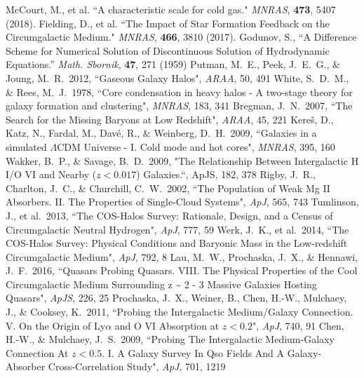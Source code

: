 \documentclass[11pt,letterpaper,english]{article}
\begin{document}
{\footnotesize

\renewcommand{\section}[2]{}
\begin{thebibliography}{500}
 McCourt, M., et al. ``A characteristic scale for cold gas." {\em MNRAS}, {\bf 473}, 5407 (2018).
 Fielding, D., et al. ``The Impact of Star Formation Feedback on the Circumgalactic Medium." {\em MNRAS}, {\bf 466}, 3810 (2017).
 Godunov, S., ``A Difference Scheme for Numerical Solution of Discontinuous Solution of Hydrodynamic Equations.'' {\em Math. Sbornik}, {\bf 47}, 271 (1959)
 Putman, M.~E., Peek, J.~E.~G., \& Joung, M.~R.\ 2012,  ``Gaseous Galaxy Halos", {\em ARAA}, 50, 491 
 White, S.~D.~M., \& Rees, M.~J.\ 1978,  ``Core condensation in heavy halos - A two-stage theory for galaxy formation and clustering", {\em MNRAS}, 183, 341 
 Bregman, J.~N.\ 2007,  ``The Search for the Missing Baryons at Low Redshift", {\em ARAA}, 45, 221 
 Kere{\v s}, D., Katz, N., Fardal, M., Dav{\'e}, R., \& Weinberg, D.~H.\ 2009,  ``Galaxies in a simulated {$\Lambda$}CDM Universe - I. Cold mode and hot cores", {\em MNRAS}, 395, 160 
  Wakker, B.~P.,  \& Savage, B.~D.\ 2009,  "The Relationship Between Intergalactic H I/O VI and Nearby ($z < 0.017$) Galaxies.``, {\rm ApJS}, 182, 378
 Rigby, J.~R., Charlton, J.~C., \& Churchill, C.~W.\ 2002,  ``The Population of Weak Mg II Absorbers. II. The Properties of Single-Cloud Systems", {\em ApJ}, 565, 743 
 Tumlinson, J., et al.\ 2013,  ``The COS-Halos Survey: Rationale, Design, and a Census of Circumgalactic Neutral Hydrogen", {\em ApJ}, 777, 59 
 Werk, J.~K., et al.\ 2014,  ``The COS-Halos Survey: Physical Conditions and Baryonic Mass in the Low-redshift Circumgalactic Medium", {\em ApJ}, 792, 8 
 Lau, M.~W., Prochaska, J.~X., \& Hennawi, J.~F.\ 2016,  ``Quasars Probing Quasars. VIII. The Physical Properties of the Cool Circumgalactic Medium Surrounding z \~{} 2 - 3 Massive Galaxies Hosting Quasars", {\em ApJS}, 226, 25 
 Prochaska, J.~X., Weiner, B., Chen, H.-W., Mulchaey, J., \& Cooksey, K.\ 2011,  ``Probing the Intergalactic Medium/Galaxy Connection. V. On the Origin of Ly{$\alpha$} and O VI Absorption at $z < 0.2$", {\em ApJ}, 740, 91 
 Chen, H.-W., \& Mulchaey, J.~S.\ 2009,  ``Probing The Intergalactic Medium-Galaxy Connection At $z < 0.5$. I. A Galaxy Survey In Qso Fields And A Galaxy-Absorber Cross-Correlation Study", {\em ApJ}, 701, 1219 

\end{thebibliography}}
\end{document}
